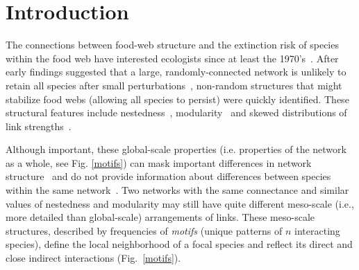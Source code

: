 \documentclass[12pt]{article}
\begin{document}
\clearpage
    
\section*{Introduction}

	The connections between food-web structure and the extinction risk of species within the food web have interested ecologists since at least the 1970's~\citep{May1972}. After early findings suggested that a large, randomly-connected network is unlikely to retain all species after small perturbations~\citep{Gardner1970,May1972}, non-random structures that might stabilize food webs (allowing all species to persist) were quickly identified. These structural features include nestedness~\citep{Allesina2012,Sauve2014}, modularity~\citep{Sauve2014,Thebault2010} and skewed distributions of link strengths~\citep{McCann1998,Gross2009,Rooney2012,Wootton2016}.
	
	
	Although important, these global-scale properties (i.e. properties of the network as a whole, see Fig. \ref{motifs}) can mask important differences in  network structure~\citep{Simmons2019} and do not provide information about differences between species within the same network~\citep{Cirtwill2018FoodWebs}. 
	Two networks with the same connectance and similar values of nestedness and modularity may still have quite different meso-scale (i.e., more detailed than global-scale) arrangements of links. 
	These meso-scale structures, described by frequencies of \emph{motifs} (unique patterns of $n$ interacting species), define the local neighborhood of a focal species and reflect its direct and close indirect interactions (Fig.~\ref{motifs}).
	
\end{document}
